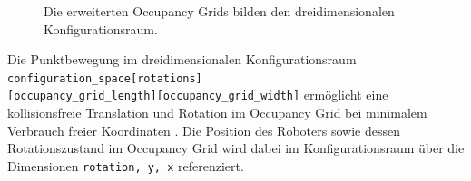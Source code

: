 \vspace*{0.46cm}
\begin{figure}[H]
	\centering
	\footnotesize
	\centerline{}
	\caption{Die erweiterten Occupancy Grids bilden den dreidimensionalen Konfigurationsraum.}
\end{figure}

Die Punktbewegung im dreidimensionalen Konfigurationsraum \texttt{configuration\_space[rotations]}\\\texttt{[occupancy\_grid\_length][occupancy\_grid\_width]} ermöglicht eine kollisionsfreie Translation und Rotation im Occupancy Grid bei minimalem Verbrauch freier Koordinaten \cite{wang.2000}. 
Die Position des Roboters sowie dessen Rotationszustand im Occupancy Grid wird dabei im Konfigurationsraum über die Dimensionen \texttt{rotation, y, x} referenziert.


